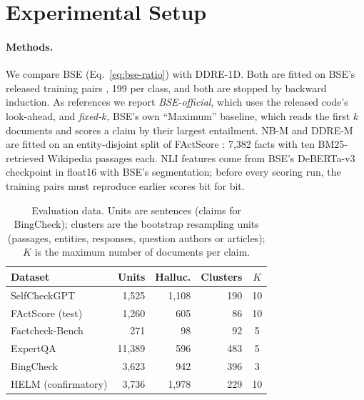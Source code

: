 \documentclass[11pt]{article}
\begin{document}
\section{Experimental Setup}
\label{sec:setup}

\paragraph{Methods.} We compare BSE (Eq.~\ref{eq:bse-ratio}) with DDRE-1D.
Both are fitted on BSE's released training pairs
\citep{wang-etal-2023-hallucination}, 199 per class, and both are stopped by
backward induction. As references we report \emph{BSE-official}, which uses
the released code's look-ahead, and \emph{fixed-$k$}, BSE's own ``Maximum''
baseline, which reads the first $k$ documents and scores a claim by their
largest entailment. NB-M and DDRE-M are fitted on an entity-disjoint split of
FActScore \citep{min-etal-2023-factscore}: 7,382 facts with ten
BM25-retrieved Wikipedia passages each. NLI features come from BSE's
DeBERTa-v3 checkpoint \citep{he2023debertav3,laurer2024less} in float16 with
BSE's segmentation; before every scoring run, the training pairs must
reproduce earlier scores bit for bit.

\begin{table}[t]
\centering\small
\setlength{\tabcolsep}{3.5pt}
\begin{tabular}{@{}lrrrc@{}}
\toprule
Dataset & Units & Halluc. & Clusters & $K$ \\
\midrule
SelfCheckGPT & 1,525 & 1,108 & 190 & 10 \\
FActScore (test) & 1,260 & 605 & 86 & 10 \\
Factcheck-Bench & 271 & 98 & 92 & 5 \\
ExpertQA & 11,389 & 596 & 483 & 5 \\
BingCheck & 3,623 & 942 & 396 & 3 \\
\midrule
HELM (confirmatory) & 3,736 & 1,978 & 229 & 10 \\
\bottomrule
\end{tabular}
\caption{Evaluation data. Units are sentences (claims for BingCheck); clusters
are the bootstrap resampling units (passages, entities, responses, question
authors or articles); $K$ is the maximum number of documents per claim.}
\label{tab:data}
\end{table}
\end{document}
